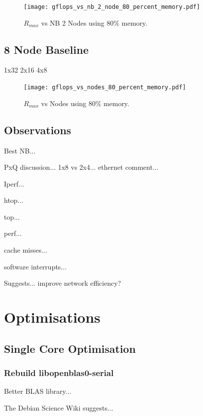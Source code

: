 \documentclass{report}
\begin{document}
\begin{figure}
	\centering	
	\texttt{[image: gflops\_vs\_nb\_2\_node\_80\_percent\_memory.pdf]}
	\caption{$R_{max}$ vs NB 2 Nodes using 80\% memory.}
\end{figure}


\subsection{8 Node Baseline}

1x32
2x16
4x8

\begin{figure}
	\centering	
	\texttt{[image: gflops\_vs\_nodes\_80\_percent\_memory.pdf]}
	\caption{$R_{max}$ vs Nodes using 80\% memory.}
\end{figure}



\subsection{Observations}

Best NB...

PxQ discussion... 1x8 vs 2x4... ethernet comment...

Iperf...

htop...

top...

perf...

cache misses...

software interrupts...

Suggests... improve network efficiency?



%
%
\clearpage\section{Optimisations}


%
%
\subsection{Single Core Optimisation}


%
%
\subsubsection{Rebuild libopenblas0-serial}

Better BLAS library...

The Debian Science Wiki suggests...
\end{document}

